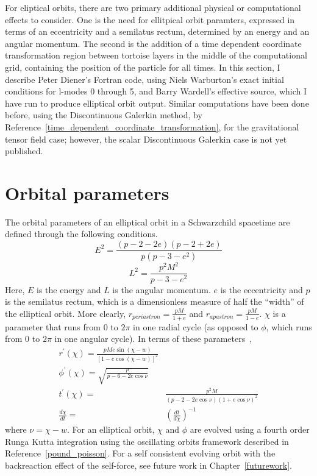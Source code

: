 For eliptical orbits, there are two primary additional physical or computational effects to consider. One is the need for ellitpical orbit paramters, expressed in terms of an eccentricity and a semilatus rectum, determined by an energy and an angular momentum. The second is the addition of a time dependent coordinate transformation region between tortoise layers in the middle of the computational grid, containing the position of the particle for all times. In this section, I describe Peter Diener's Fortran code, using Niels Warburton's exact initial conditions for l-modes 0 through 5, and Barry Wardell's effective source, which I have run to produce elliptical orbit output. Similar computations have been done before, using the Discontinuous Galerkin method, by Reference~\ref{time_dependent_coordinate_transformation}, for the gravitational tensor field case; however, the scalar Discontinuous Galerkin case is not yet published.

\section{Orbital parameters}

The orbital parameters of an elliptical orbit in a Schwarzchild spacetime are defined through the following conditions.
\begin{equation}
  E^2=\frac{(p-2-2e)(p-2+2e)}{p(p-3-e^2)}
\end{equation}
\begin{equation}
  L^2=\frac{p^2M^2}{p-3-e^2}
\end{equation}
Here, $E$ is the energy and $L$ is the angular momentum. $e$ is the eccentricity and $p$ is the semilatus rectum, which is a dimensionless measure of half the ``width'' of the elliptical orbit. More clearly, $r_{periastron}=\frac{pM}{1+e}$ and $r_{apastron}=\frac{pM}{1-e}$. $\chi$ is a parameter that runs from $0$ to $2\pi$ in one radial cycle (as opposed to $\phi$, which runs from $0$ to $2\pi$ in one angular cycle). In terms of these parameters~\cite{pound_poisson},
\begin{eqnarray}
  r^\prime(\chi)=\frac{pMe\sin(\chi-w)}{[1-e\cos(\chi-w)]^2}\\
  \phi^\prime(\chi)=\sqrt{\frac{p}{p-6-2e\cos\nu}}\\
  t^\prime(\chi)=&\frac{p^2M}{(p-2-2e\cos\nu)(1+e\cos\nu)^2}\nonumber\\
  \frac{d\chi}{dt}=&(\frac{dt}{d\chi})^{-1}
\end{eqnarray}
where $\nu=\chi-w$. For an elliptical orbit, $\chi$ and $\phi$ are evolved using a fourth order Runga Kutta integration using the oscillating orbits framework described in Reference~\ref{pound_poisson}. For a self consistent evolving orbit with the backreaction effect of the self-force, see future work in Chapter~\ref{futurework}. 


